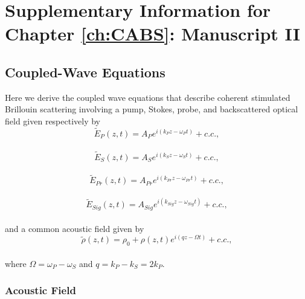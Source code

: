 \doublespacing
\chapter{Supplementary Information for Chapter \ref{ch:CABS}: Manuscript II}
\label{appendix: CABS}
\acresetall


\section{Coupled-Wave Equations}
\label{Appendix:Coupled-Wave Equations}

Here we derive the coupled wave equations that describe coherent stimulated Brillouin scattering involving a pump, Stokes, probe, and backscattered optical field given respectively by
\\
\begin{equation}
    \tilde{E}_{P}(z,t) = A_{P}e^{i(k_{P}z - \omega_{P}t)} + c.c.,
    \label{eq:Pump optical field}
\end{equation}
\\
\begin{equation}
    \tilde{E}_{S}(z,t) = A_{S}e^{i(k_{S}z - \omega_{S}t)} + c.c.,
    \label{eq:Stokes optical field}
\end{equation}
\\
\begin{equation}
    \tilde{E}_{Pr}(z,t) = A_{Pr}e^{i(k_{Pr}z - \omega_{Pr}t)} + c.c.,
    \label{eq:Probe optical field}
\end{equation}
\\
\begin{equation}
    \tilde{E}_{Sig}(z,t) = A_{Sig}e^{i(k_{Sig}z - \omega_{Sig}t)} + c.c.,
    \label{eq:Signal optical field}
\end{equation}
\\
\noindent and a common acoustic field given by
\\
\begin{equation}
    \tilde{\rho}(z,t) = \rho_{0} + \rho(z,t)e^{i(qz - \Omega t)} + c.c.,
    \label{eq:acoustic field}
\end{equation}
\\
\noindent where \(\Omega = \omega_{P} - \omega_{S}\) and \(q = k_{P} - k_{S} = 2k_{P}\).


\subsection{Acoustic Field}
\label{Coupled-Wave Equations:Acoustic Field}

